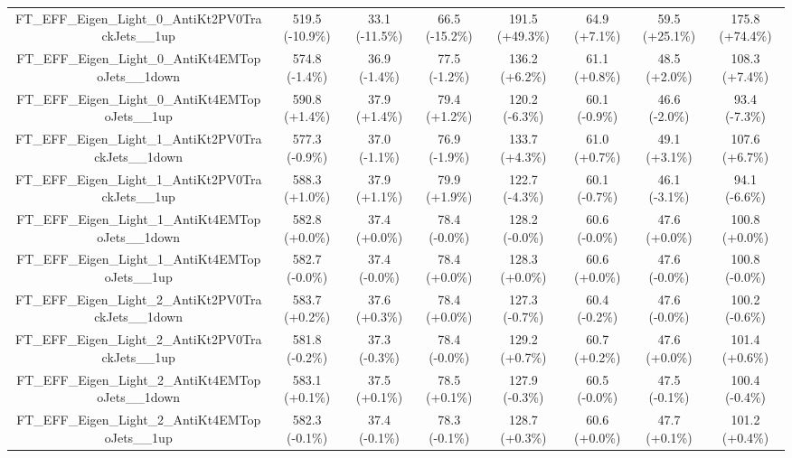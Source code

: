 \begin{table}[htbp!]
\begin{tiny}
\begin{center}
\begin{tabular}{c|c|c|c||c|c|c|c}
FT\_EFF\_Eigen\_Light\_0\_AntiKt2PV0TrackJets\_\_1up         & 519.5     (-10.9\%) & 33.1      (-11.5\%) & 66.5      (-15.2\%) & 191.5     (+49.3\%) & 64.9      (+7.1\%) & 59.5      (+25.1\%) & 175.8     (+74.4\%) \\ 
FT\_EFF\_Eigen\_Light\_0\_AntiKt4EMTopoJets\_\_1down         & 574.8     (-1.4\%) & 36.9      (-1.4\%) & 77.5      (-1.2\%) & 136.2     (+6.2\%) & 61.1      (+0.8\%) & 48.5      (+2.0\%) & 108.3     (+7.4\%) \\ 
FT\_EFF\_Eigen\_Light\_0\_AntiKt4EMTopoJets\_\_1up           & 590.8     (+1.4\%) & 37.9      (+1.4\%) & 79.4      (+1.2\%) & 120.2     (-6.3\%) & 60.1      (-0.9\%) & 46.6      (-2.0\%) & 93.4      (-7.3\%) \\ 
FT\_EFF\_Eigen\_Light\_1\_AntiKt2PV0TrackJets\_\_1down       & 577.3     (-0.9\%) & 37.0      (-1.1\%) & 76.9      (-1.9\%) & 133.7     (+4.3\%) & 61.0      (+0.7\%) & 49.1      (+3.1\%) & 107.6     (+6.7\%) \\ 
FT\_EFF\_Eigen\_Light\_1\_AntiKt2PV0TrackJets\_\_1up         & 588.3     (+1.0\%) & 37.9      (+1.1\%) & 79.9      (+1.9\%) & 122.7     (-4.3\%) & 60.1      (-0.7\%) & 46.1      (-3.1\%) & 94.1      (-6.6\%) \\ 
FT\_EFF\_Eigen\_Light\_1\_AntiKt4EMTopoJets\_\_1down         & 582.8     (+0.0\%) & 37.4      (+0.0\%) & 78.4      (-0.0\%) & 128.2     (-0.0\%) & 60.6      (-0.0\%) & 47.6      (+0.0\%) & 100.8     (+0.0\%) \\ 
FT\_EFF\_Eigen\_Light\_1\_AntiKt4EMTopoJets\_\_1up           & 582.7     (-0.0\%) & 37.4      (-0.0\%) & 78.4      (+0.0\%) & 128.3     (+0.0\%) & 60.6      (+0.0\%) & 47.6      (-0.0\%) & 100.8     (-0.0\%) \\ 
FT\_EFF\_Eigen\_Light\_2\_AntiKt2PV0TrackJets\_\_1down       & 583.7     (+0.2\%) & 37.6      (+0.3\%) & 78.4      (+0.0\%) & 127.3     (-0.7\%) & 60.4      (-0.2\%) & 47.6      (-0.0\%) & 100.2     (-0.6\%) \\ 
FT\_EFF\_Eigen\_Light\_2\_AntiKt2PV0TrackJets\_\_1up         & 581.8     (-0.2\%) & 37.3      (-0.3\%) & 78.4      (-0.0\%) & 129.2     (+0.7\%) & 60.7      (+0.2\%) & 47.6      (+0.0\%) & 101.4     (+0.6\%) \\ 
FT\_EFF\_Eigen\_Light\_2\_AntiKt4EMTopoJets\_\_1down         & 583.1     (+0.1\%) & 37.5      (+0.1\%) & 78.5      (+0.1\%) & 127.9     (-0.3\%) & 60.5      (-0.0\%) & 47.5      (-0.1\%) & 100.4     (-0.4\%) \\ 
FT\_EFF\_Eigen\_Light\_2\_AntiKt4EMTopoJets\_\_1up           & 582.3     (-0.1\%) & 37.4      (-0.1\%) & 78.3      (-0.1\%) & 128.7     (+0.3\%) & 60.6      (+0.0\%) & 47.7      (+0.1\%) & 101.2     (+0.4\%) \\ 

\end{tabular}
\end{center}
\end{tiny}
\end{table}
